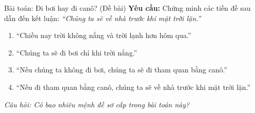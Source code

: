 \documentclass[12pt,a4paper]{article}
\begin{document}
\begin{baitap}{Bài toán: Đi bơi hay đi canô? (Đề bài)}
\textbf{Yêu cầu:} Chứng minh các tiền đề sau dẫn đến kết luận: \textit{``Chúng ta sẽ về nhà trước khi mặt trời lặn.''}
\begin{enumerate}
  \item ``Chiều nay trời không nắng và trời lạnh hơn hôm qua.''
  \item ``Chúng ta sẽ đi bơi chỉ khi trời nắng.''
  \item ``Nếu chúng ta không đi bơi, chúng ta sẽ đi tham quan bằng canô.''
  \item ``Nếu đi tham quan bằng canô, chúng ta sẽ về nhà trước khi mặt trời lặn.''
\end{enumerate}
\textit{Câu hỏi: Có bao nhiêu mệnh đề sơ cấp trong bài toán này?}
\end{baitap}
\end{document}
